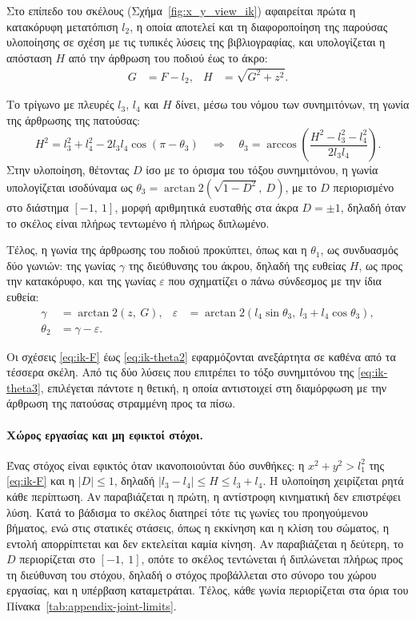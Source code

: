 \documentclass[11pt]{report}
\begin{document}
Στο επίπεδο του σκέλους (Σχήμα~\ref{fig:x_y_view_ik}) αφαιρείται πρώτα η
κατακόρυφη μετατόπιση $l_2$, η οποία αποτελεί και τη διαφοροποίηση της παρούσας
υλοποίησης σε σχέση με τις τυπικές λύσεις της βιβλιογραφίας, και υπολογίζεται η
απόσταση $H$ από την άρθρωση του ποδιού έως το άκρο:
\begin{align}
G &= F - l_2, &
H &= \sqrt{G^{2} + z^{2}}.
\label{eq:ik-GH}
\end{align}

Το τρίγωνο με πλευρές $l_3$, $l_4$ και $H$ δίνει, μέσω του νόμου των
συνημιτόνων, τη γωνία της άρθρωσης της πατούσας:
\begin{equation}
H^{2} = l_3^{2} + l_4^{2} - 2 l_3 l_4 \cos(\pi - \theta_3)
\quad \Longrightarrow \quad
\theta_3 = \arccos\!\left(\frac{H^{2} - l_3^{2} - l_4^{2}}{2 l_3 l_4}\right).
\label{eq:ik-theta3}
\end{equation}
Στην υλοποίηση, θέτοντας $D$ ίσο με το όρισμα του τόξου συνημιτόνου, η γωνία
υπολογίζεται ισοδύναμα ως $\theta_3 = \arctan2\!\left(\sqrt{1-D^{2}},\ D\right)$,
με το $D$ περιορισμένο στο διάστημα $[-1,\ 1]$, μορφή αριθμητικά ευσταθής στα
άκρα $D = \pm 1$, δηλαδή όταν το σκέλος είναι πλήρως τεντωμένο ή πλήρως
διπλωμένο.

Τέλος, η γωνία της άρθρωσης του ποδιού προκύπτει, όπως και η $\theta_1$, ως
συνδυασμός δύο γωνιών: της γωνίας $\gamma$ της διεύθυνσης του άκρου, δηλαδή της
ευθείας $H$, ως προς την κατακόρυφο, και της γωνίας $\varepsilon$ που
σχηματίζει ο πάνω σύνδεσμος με την ίδια ευθεία:
\begin{align}
\gamma &= \arctan2(z,\ G), &
\varepsilon &= \arctan2\!\left(l_4 \sin\theta_3,\ l_3 + l_4 \cos\theta_3\right), \\
\theta_2 &= \gamma - \varepsilon. &&
\label{eq:ik-theta2}
\end{align}

Οι σχέσεις \eqref{eq:ik-F} έως \eqref{eq:ik-theta2} εφαρμόζονται ανεξάρτητα σε
καθένα από τα τέσσερα σκέλη. Από τις δύο λύσεις που επιτρέπει το τόξο
συνημιτόνου της \eqref{eq:ik-theta3}, επιλέγεται πάντοτε η θετική, η οποία
αντιστοιχεί στη διαμόρφωση με την άρθρωση της πατούσας στραμμένη προς τα πίσω.

\paragraph{Χώρος εργασίας και μη εφικτοί στόχοι.}
Ένας στόχος είναι εφικτός όταν ικανοποιούνται δύο συνθήκες: η
$x^2 + y^2 > l_1^{2}$ της \eqref{eq:ik-F} και η $|D| \leq 1$, δηλαδή
$|l_3 - l_4| \leq H \leq l_3 + l_4$. Η υλοποίηση χειρίζεται ρητά κάθε
περίπτωση. Αν παραβιάζεται η πρώτη, η αντίστροφη κινηματική δεν επιστρέφει
λύση. Κατά το βάδισμα το σκέλος διατηρεί τότε τις γωνίες του προηγούμενου
βήματος, ενώ στις στατικές στάσεις, όπως η εκκίνηση και η κλίση του σώματος, η
εντολή απορρίπτεται και δεν εκτελείται καμία κίνηση. Αν παραβιάζεται η δεύτερη,
το $D$ περιορίζεται στο $[-1,\ 1]$, οπότε το σκέλος τεντώνεται ή διπλώνεται
πλήρως προς τη διεύθυνση του στόχου, δηλαδή ο στόχος προβάλλεται στο σύνορο
του χώρου εργασίας, και η υπέρβαση καταμετράται. Τέλος, κάθε γωνία
περιορίζεται στα όρια του Πίνακα~\ref{tab:appendix-joint-limits}.
\end{document}

